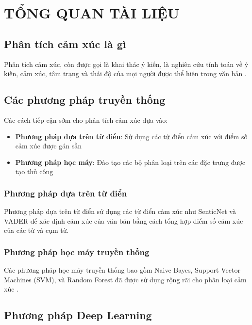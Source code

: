 \chapter{TỔNG QUAN TÀI LIỆU}
\label{chap:related}

\section{Phân tích cảm xúc là gì}

Phân tích cảm xúc, còn được gọi là khai thác ý kiến, là nghiên cứu tính toán về ý kiến, cảm xúc, tâm trạng và thái độ của mọi người được thể hiện trong văn bản \cite{liu2012sentiment}.

\section{Các phương pháp truyền thống}

Các cách tiếp cận sớm cho phân tích cảm xúc dựa vào:
\begin{itemize}
    \item \textbf{Phương pháp dựa trên từ điển}: Sử dụng các từ điển cảm xúc với điểm số cảm xúc được gán sẵn
    \item \textbf{Phương pháp học máy}: Đào tạo các bộ phân loại trên các đặc trưng được tạo thủ công
\end{itemize}

\subsection{Phương pháp dựa trên từ điển}

Phương pháp dựa trên từ điển sử dụng các từ điển cảm xúc như SenticNet \cite{cambria2016senticnet} và VADER \cite{hutto2014vader} để xác định cảm xúc của văn bản bằng cách tổng hợp điểm số cảm xúc của các từ và cụm từ.

\subsection{Phương pháp học máy truyền thống}

Các phương pháp học máy truyền thống bao gồm Naive Bayes, Support Vector Machines (SVM), và Random Forest đã được sử dụng rộng rãi cho phân loại cảm xúc \cite{pang2002thumbs}.

\section{Phương pháp Deep Learning}


